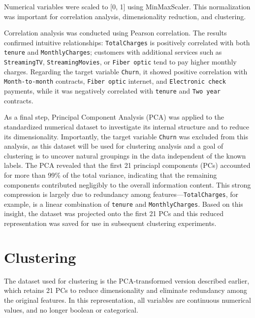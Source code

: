 \documentclass[a4paper,11pt]{article}
\begin{document}
Numerical variables were scaled to [0, 1] using MinMaxScaler. This normalization was important for correlation analysis, dimensionality reduction, and clustering.

Correlation analysis was conducted using Pearson correlation. The results confirmed intuitive relationships: \texttt{TotalCharges} is positively correlated with both \texttt{tenure} and \texttt{MonthlyCharges}; customers with additional services such as \texttt{StreamingTV}, \texttt{StreamingMovies}, or \texttt{Fiber optic} tend to pay higher monthly charges. Regarding the target variable \texttt{Churn}, it showed positive correlation with \texttt{Month-to-month} contracts, \texttt{Fiber optic} internet, and \texttt{Electronic check} payments, while it was negatively correlated with \texttt{tenure} and \texttt{Two year} contracts.

As a final step, Principal Component Analysis (PCA) was applied to the standardized numerical dataset to investigate its internal structure and to reduce its dimensionality. Importantly, the target variable \texttt{Churn} was excluded from this analysis, as this dataset will be used for clustering analysis and a goal of clustering is to uncover natural groupings in the data independent of the known labels. The PCA revealed that the first 21 princiapl components (PCs) accounted for more than 99\% of the total variance, indicating that the remaining components contributed negligibly to the overall information content. This strong compression is largely due to redundancy among features—\texttt{TotalCharges}, for example, is a linear combination of \texttt{tenure} and \texttt{MonthlyCharges}. Based on this insight, the dataset was projected onto the first 21 PCs and this reduced representation was saved for use in subsequent clustering experiments.

\section{Clustering}
The dataset used for clustering is the PCA-transformed version described earlier, which retains 21 PCs to reduce dimensionality and eliminate redundancy among the original features. In this representation, all variables are continuous numerical values, and no longer boolean or categorical.
\end{document}
